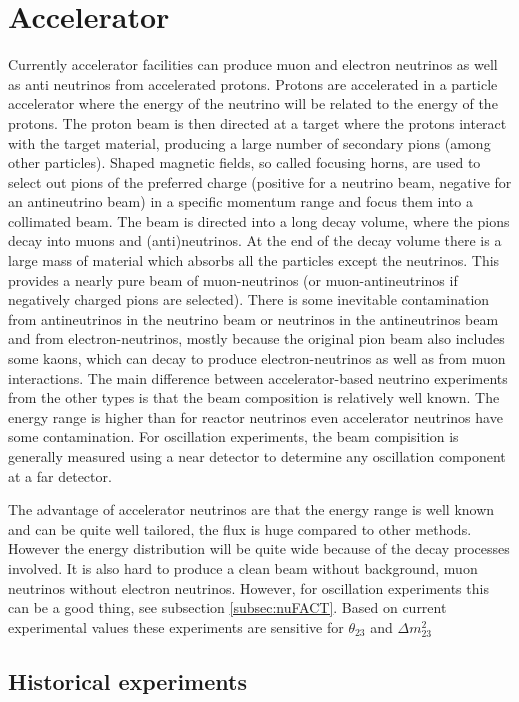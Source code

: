 \pagebreak
\newpage
\section{Accelerator}
Currently accelerator facilities can produce muon and electron neutrinos as well as anti neutrinos from accelerated protons. Protons are accelerated in a particle accelerator where the energy of the neutrino will be related to the energy of the protons. The proton beam is then directed at a target where the protons interact with the target material, producing a large number of secondary pions (among other particles). Shaped magnetic fields, so called focusing horns, are used to select out pions of the preferred charge (positive for a neutrino beam, negative for an antineutrino beam) in a specific momentum range and focus them into a collimated beam. The beam is directed into a long decay volume, where the pions decay into muons and (anti)neutrinos. At the end of the decay volume there is a large mass of material which absorbs all the particles except the neutrinos. This provides a nearly pure beam of muon-neutrinos (or muon-antineutrinos if negatively charged pions are selected). There is some inevitable contamination from antineutrinos in the neutrino beam or neutrinos in the antineutrinos beam and from electron-neutrinos, mostly because the original pion beam also includes some kaons, which can decay to produce electron-neutrinos as well as from muon interactions. The main difference between accelerator-based neutrino experiments from the other types is that the beam composition is relatively well known. The energy range is higher than for reactor neutrinos even accelerator neutrinos have some contamination. For oscillation experiments, the beam compisition is generally measured using a near detector to determine any oscillation component at a far detector.

The advantage of accelerator neutrinos are that the energy range is well known and can be quite well tailored, the flux is huge compared to other methods. However the energy distribution will be quite wide because of the decay processes involved. It is also hard to produce a clean beam without background, muon neutrinos without electron neutrinos. However, for oscillation experiments this can be a good thing, see subsection \ref{subsec:nuFACT}. Based on current experimental values these experiments are sensitive for $\theta_{23}$ and $\Delta m_{23}^2 $

\subsection{Historical experiments}

